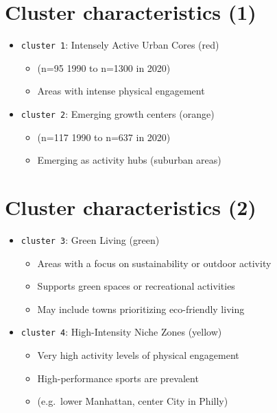 \documentclass[
  letterpaper,
  DIV=11,
  numbers=noendperiod]{scrartcl}
\providecommand{\tightlist}{%
  \setlength{\itemsep}{0pt}\setlength{\parskip}{0pt}}\usepackage{longtable,booktabs,array}
\begin{document}
\hypertarget{cluster-characteristics-1}{%
\section{Cluster characteristics (1)}\label{cluster-characteristics-1}}

\begin{itemize}
\tightlist
\item
  \texttt{cluster\ 1}: Intensely Active Urban Cores (red)

  \begin{itemize}
  \tightlist
  \item
    (n=95 1990 to n=1300 in 2020)
  \item
    Areas with intense physical engagement
  \end{itemize}
\item
  \texttt{cluster\ 2}: Emerging growth centers (orange)

  \begin{itemize}
  \tightlist
  \item
    (n=117 1990 to n=637 in 2020)
  \item
    Emerging as activity hubs (suburban areas)
  \end{itemize}
\end{itemize}

\hypertarget{cluster-characteristics-2}{%
\section{Cluster characteristics (2)}\label{cluster-characteristics-2}}

\begin{itemize}
\tightlist
\item
  \texttt{cluster\ 3}: Green Living (green)

  \begin{itemize}
  \tightlist
  \item
    Areas with a focus on sustainability or outdoor activity
  \item
    Supports green spaces or recreational activities
  \item
    May include towns prioritizing eco-friendly living
  \end{itemize}
\item
  \texttt{cluster\ 4}: High-Intensity Niche Zones (yellow)

  \begin{itemize}
  \tightlist
  \item
    Very high activity levels of physical engagement
  \item
    High-performance sports are prevalent
  \item
    (e.g.~lower Manhattan, center City in Philly)
  \end{itemize}
\end{itemize}
\end{document}
